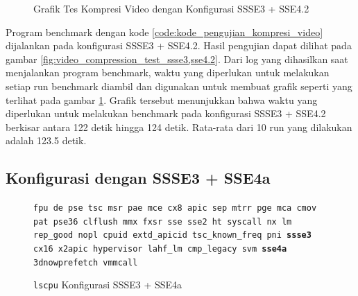 \begin{figure}
    \centering
    \caption{Grafik Tes Kompresi Video dengan Konfigurasi SSSE3 + SSE4.2}
    \label{fig:video_compression_test_ssse3,sse4.2_graph}
\end{figure}

Program benchmark dengan kode \ref{code:kode_pengujian_kompresi_video} dijalankan pada konfigurasi SSSE3 + SSE4.2. Hasil pengujian dapat dilihat pada gambar \ref{fig:video_compression_test_ssse3,sse4.2}. Dari log yang dihasilkan saat menjalankan program benchmark, waktu yang diperlukan untuk melakukan setiap run benchmark diambil dan digunakan untuk membuat grafik seperti yang terlihat pada gambar \ref{fig:video_compression_test_ssse3,sse4.2_graph}. Grafik tersebut menunjukkan bahwa waktu yang diperlukan untuk melakukan benchmark pada konfigurasi SSSE3 + SSE4.2 berkisar antara 122 detik hingga 124 detik. Rata-rata dari 10 run yang dilakukan adalah 123.5 detik.

\subsection{Konfigurasi dengan SSSE3 + SSE4a}
\begin{figure}
    \texttt{fpu de pse tsc msr pae mce cx8 apic sep mtrr pge mca cmov pat pse36 clflush mmx fxsr sse sse2 ht syscall nx lm rep\_good nopl cpuid extd\_apicid tsc\_known\_freq pni \textbf{ssse3} cx16 x2apic hypervisor lahf\_lm cmp\_legacy svm \textbf{sse4a} 3dnowprefetch vmmcall}
    \caption{\texttt{lscpu} Konfigurasi SSSE3 + SSE4a}
    \label{fig:lscpu_video_compression_test_ssse3,sse4a}
\end{figure}


